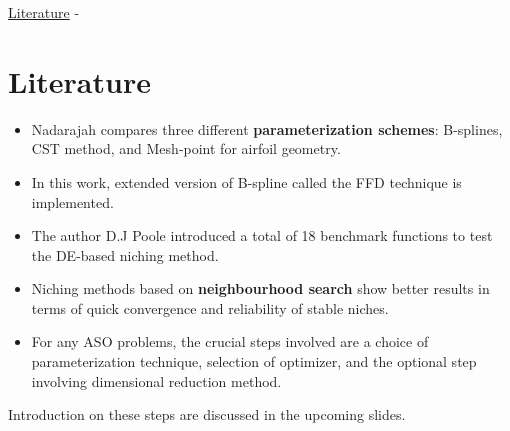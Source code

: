 \begin{frame}[allowframebreaks]{\underline{Literature} -}
\section{Literature}

\begin{itemize}
\item Nadarajah\cite{Nadarajah} compares three different \textbf{parameterization schemes}: B-splines, CST method, and Mesh-point for airfoil geometry.
\item In this work, extended version of B-spline called the FFD technique is implemented.
\item The author D.J Poole\cite{Poole3} introduced a total of 18 benchmark functions to test the DE-based niching method. 
\item Niching methods based on \textbf{neighbourhood search} show better results in terms of quick convergence and reliability of stable niches.
\item For any ASO problems, the crucial steps involved are a choice of parameterization technique, selection of optimizer, and the optional step involving dimensional reduction method.
\end{itemize}
Introduction on these steps are discussed in the upcoming slides.

\end{frame}